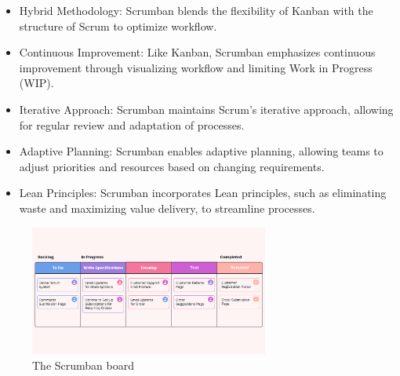 \begin{itemize}
    \item Hybrid Methodology: Scrumban blends the flexibility of Kanban with the structure of Scrum to optimize workflow.
    \item Continuous Improvement: Like Kanban, Scrumban emphasizes continuous improvement through visualizing workflow and limiting Work in Progress (WIP).
    \item Iterative Approach: Scrumban maintains Scrum's iterative approach, allowing for regular review and adaptation of processes.
    \item Adaptive Planning: Scrumban enables adaptive planning, allowing teams to adjust priorities and resources based on changing requirements.
    \item Lean Principles: Scrumban incorporates Lean principles, such as eliminating waste and maximizing value delivery, to streamline processes.
\end{itemize}

\begin{figure}[H]
    \centering
    \includegraphics[width=0.7\textwidth]{src/assets/chapters/Scrumban.png}
    \caption{The Scrumban board}
    \label{fig:Scrumban_image}
\end{figure}

